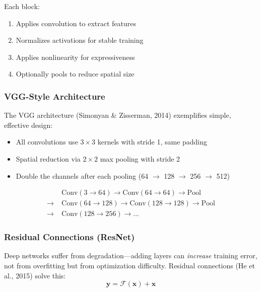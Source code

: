 Each block:
\begin{enumerate}
    \item Applies convolution to extract features
    \item Normalizes activations for stable training
    \item Applies nonlinearity for expressiveness
    \item Optionally pools to reduce spatial size
\end{enumerate}

\subsubsection{VGG-Style Architecture}

The VGG architecture (Simonyan \& Zisserman, 2014) exemplifies simple, effective design:
\begin{itemize}
    \item All convolutions use $3 \times 3$ kernels with stride 1, same padding
    \item Spatial reduction via $2 \times 2$ max pooling with stride 2
    \item Double the channels after each pooling (64 $\rightarrow$ 128 $\rightarrow$ 256 $\rightarrow$ 512)
\end{itemize}

\begin{equation}
\begin{aligned}
&\text{Conv}(3 \rightarrow 64) \rightarrow \text{Conv}(64 \rightarrow 64) \rightarrow \text{Pool} \\
\rightarrow\; &\text{Conv}(64 \rightarrow 128) \rightarrow \text{Conv}(128 \rightarrow 128) \rightarrow \text{Pool} \\
\rightarrow\; &\text{Conv}(128 \rightarrow 256) \rightarrow \text{...}
\end{aligned}
\end{equation}

\subsubsection{Residual Connections (ResNet)}

Deep networks suffer from degradation---adding layers can \textit{increase} training error, not from overfitting but from optimization difficulty. Residual connections (He et al., 2015) solve this:
\begin{equation}
\mathbf{y} = \mathcal{F}(\mathbf{x}) + \mathbf{x}
\label{eq:residual}
\end{equation}

